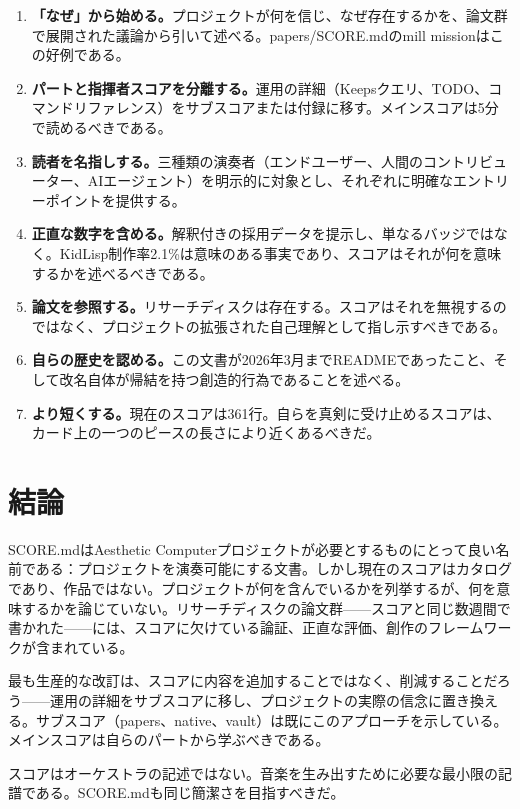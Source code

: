 \documentclass[10pt,letterpaper,twocolumn]{article}
\begin{document}
\begin{enumerate}
\item \textbf{「なぜ」から始める。}プロジェクトが何を信じ、なぜ存在するかを、論文群で展開された議論から引いて述べる。papers/SCORE.mdのmill missionはこの好例である。
\item \textbf{パートと指揮者スコアを分離する。}運用の詳細（Keepsクエリ、TODO、コマンドリファレンス）をサブスコアまたは付録に移す。メインスコアは5分で読めるべきである。
\item \textbf{読者を名指しする。}三種類の演奏者（エンドユーザー、人間のコントリビューター、AIエージェント）を明示的に対象とし、それぞれに明確なエントリーポイントを提供する。
\item \textbf{正直な数字を含める。}解釈付きの採用データを提示し、単なるバッジではなく。KidLisp制作率2.1\%は意味のある事実であり、スコアはそれが何を意味するかを述べるべきである。
\item \textbf{論文を参照する。}リサーチディスクは存在する。スコアはそれを無視するのではなく、プロジェクトの拡張された自己理解として指し示すべきである。
\item \textbf{自らの歴史を認める。}この文書が2026年3月までREADMEであったこと、そして改名自体が帰結を持つ創造的行為であることを述べる。
\item \textbf{より短くする。}現在のスコアは361行。自らを真剣に受け止めるスコアは、カード上の一つのピースの長さにより近くあるべきだ。
\end{enumerate}

\section{結論}

SCORE.mdはAesthetic Computerプロジェクトが必要とするものにとって良い名前である：プロジェクトを演奏可能にする文書。しかし現在のスコアはカタログであり、作品ではない。プロジェクトが何を含んでいるかを列挙するが、何を意味するかを論じていない。リサーチディスクの論文群——スコアと同じ数週間で書かれた——には、スコアに欠けている論証、正直な評価、創作のフレームワークが含まれている。

最も生産的な改訂は、スコアに内容を追加することではなく、削減することだろう——運用の詳細をサブスコアに移し、プロジェクトの実際の信念に置き換える。サブスコア（papers、native、vault）は既にこのアプローチを示している。メインスコアは自らのパートから学ぶべきである。

スコアはオーケストラの記述ではない。音楽を生み出すために必要な最小限の記譜である。SCORE.mdも同じ簡潔さを目指すべきだ。



\end{document}
